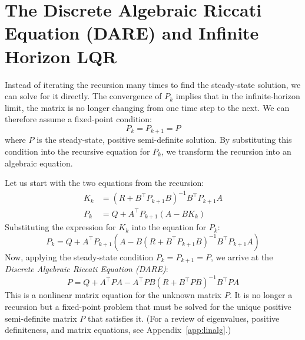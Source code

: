 \section{The Discrete Algebraic Riccati Equation (DARE) and Infinite Horizon LQR}
Instead of iterating the recursion many times to find the steady-state solution, we can solve for it directly. The convergence of $P_k$ implies that in the infinite-horizon limit, the matrix is no longer changing from one time step to the next. We can therefore assume a fixed-point condition:
\begin{equation}
	P_k = P_{k+1} = P
\end{equation}
where $P$ is the steady-state, positive semi-definite solution. By substituting this condition into the recursive equation for $P_k$, we transform the recursion into an algebraic equation. 

Let us start with the two equations from the recursion:
\begin{align*}
	K_k &= (R + B^\top P_{k+1} B)^{-1} B^\top P_{k+1} A \\
	P_k &= Q + A^\top P_{k+1} (A - B K_k)
\end{align*}
Substituting the expression for $K_k$ into the equation for $P_k$:
\begin{equation*}
	P_k = Q + A^\top P_{k+1} \left( A - B (R + B^\top P_{k+1} B)^{-1} B^\top P_{k+1} A \right)
\end{equation*}
Now, applying the steady-state condition $P_k = P_{k+1} = P$, we arrive at the \emph{Discrete Algebraic Riccati Equation (DARE)}:
\begin{equation*}
	P = Q + A^\top P A - A^\top P B (R + B^\top P B)^{-1} B^\top P A
\end{equation*}
This is a nonlinear matrix equation for the unknown matrix $P$. It is no longer a recursion but a fixed-point problem that must be solved for the unique positive semi-definite matrix $P$ that satisfies it.
(For a review of eigenvalues, positive definiteness, and matrix equations, see Appendix~\ref{app:linalg}.)

